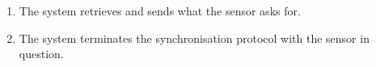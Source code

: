 \begin{usecase}
{\begin{enumerate}
		\end{enumerate}	
		\item
		\begin{enumerate}
			\item The system retrieves and sends what the sensor asks for.
			\item The system terminates the synchronisation protocol with the sensor in question.
		\end{enumerate}				
	}
\end{usecase}